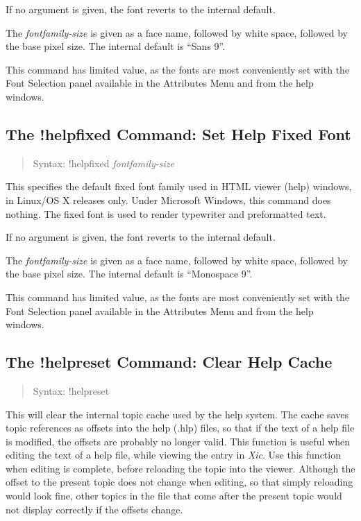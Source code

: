 If no argument is given, the font reverts to the internal default.

The {\it fontfamily-size} is given as a face name, followed by white
space, followed by the base pixel size.  The internal default is
``{\vt Sans 9}''.

This command has limited value, as the fonts are most conveniently set
with the {\cb Font Selection} panel available in the {\cb Attributes
Menu} and from the help windows.

\subsection{The {\cb !helpfixed} Command: Set Help Fixed Font}
\begin{quote}
Syntax: {\vt !helpfixed} {\it fontfamily-size}
\end{quote}
This specifies the default fixed font family used in HTML viewer
(help) windows, in Linux/OS X releases only.  Under Microsoft
Windows, this command does nothing.  The fixed font is used to render
typewriter and preformatted text.

If no argument is given, the font reverts to the internal default.

The {\it fontfamily-size} is given as a face name, followed by white
space, followed by the base pixel size.  The internal default is
``{\vt Monospace 9}''.

This command has limited value, as the fonts are most conveniently set
with the {\cb Font Selection} panel available in the {\cb Attributes
Menu} and from the help windows.

\subsection{The {\cb !helpreset} Command: Clear Help Cache}
\begin{quote}
Syntax: {\vt !helpreset}
\end{quote}
This will clear the internal topic cache used by the help system.  The
cache saves topic references as offsets into the help ({\vt .hlp})
files, so that if the text of a help file is modified, the offsets are
probably no longer valid.  This function is useful when editing the
text of a help file, while viewing the entry in {\it Xic}.  Use this
function when editing is complete, before reloading the topic into the
viewer.  Although the offset to the present topic does not change when
editing, so that simply reloading would look fine, other topics in the
file that come after the present topic would not display correctly if
the offsets change.


